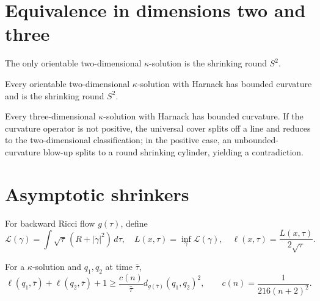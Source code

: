 \section{Equivalence in dimensions two and three}

\begin{theorem}
\label{thm:chow-iii-2d-kappa}
The only orientable two-dimensional $\kappa$-solution is the shrinking round
$S^2$.
\end{theorem}

\begin{corollary}
\label{cor:chow-iii-2d-harnack}
Every orientable two-dimensional $\kappa$-solution with Harnack has bounded
curvature and is the shrinking round $S^2$.
\end{corollary}

\begin{proposition}
\label{prop:chow-iii-3d-harnack-equivalence}
Every three-dimensional $\kappa$-solution with Harnack has bounded curvature.
If the curvature operator is not positive, the universal cover splits off a
line and reduces to the two-dimensional classification; in the positive case,
an unbounded-curvature blow-up splits to a round shrinking cylinder, yielding
a contradiction.
\end{proposition}

\section{Asymptotic shrinkers}

\begin{definition}
\label{def:chow-iii-reduced-distance}
For backward Ricci flow $g(\tau)$, define
\[
\mathcal L(\gamma)=\int\sqrt\tau\,(R+|\dot\gamma|^2)\,d\tau,
\quad L(x,\tau)=\inf_\gamma\mathcal L(\gamma),
\quad \ell(x,\tau)=\frac{L(x,\tau)}{2\sqrt\tau}.
\]
\end{definition}

\begin{lemma}
\label{lem:chow-iii-reduced-distance-two-point}
For a $\kappa$-solution and $q_1,q_2$ at time $\bar\tau$,
\[
\ell(q_1,\bar\tau)+\ell(q_2,\bar\tau)+1\ge
\frac{c(n)}{\bar\tau}d_{g(\bar\tau)}(q_1,q_2)^2,
\qquad c(n)=\frac1{216(n+2)^2}.
\]
\end{lemma}

